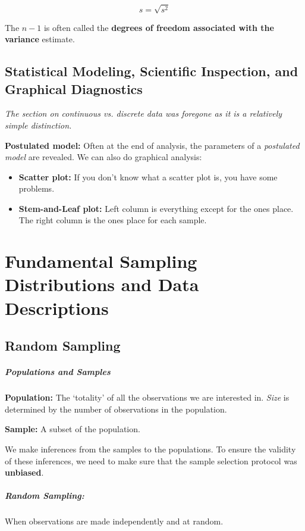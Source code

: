 \documentclass[a4paper,12pt]{report}
\begin{document}
$$s = \sqrt{s^2}$$

The $n-1$ is often called the \textbf{degrees of freedom associated with the variance} estimate.

\section{Statistical Modeling, Scientific Inspection, and Graphical Diagnostics}

\textit{The section on continuous vs. discrete data was foregone as it is a relatively simple distinction.} 

\textbf{Postulated model: } Often at the end of analysis, the parameters of a \textit{postulated model} are revealed. We can also do graphical analysis: 

\begin{itemize}
\item \textbf{Scatter plot: } If you don't know what a scatter plot is, you have some problems.
\item \textbf{Stem-and-Leaf plot: } Left column is everything except for the ones place. The right column is the ones place for each sample.
\end{itemize}


\chapter{Fundamental Sampling Distributions and Data Descriptions}

\section{Random Sampling}

\paragraph{Populations and Samples} 

\textbf{Population: } The `totality' of all the observations we are interested in. \textit{Size} is determined by the number of observations in the population. 

\textbf{Sample: } A subset of the population.

We make inferences from the samples to the populations. To ensure the validity of these inferences, we need to make sure that the sample selection protocol was \textbf{unbiased}. 

\paragraph{Random Sampling: } When observations are made independently and at random. 
\end{document}
